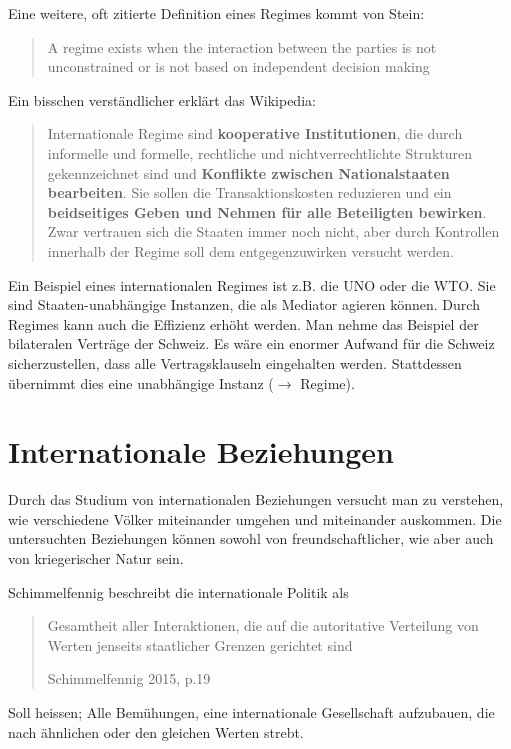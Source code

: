 \documentclass[a4paper, 11pt]{article}
\begin{document}
\noindent Eine weitere, oft zitierte Definition eines Regimes kommt von Stein:
\begin{quote}
    \begin{blockquote}[Stein 1982]{A regime exists when the interaction between the parties is not unconstrained or is not based on independent decision making}
    \end{blockquote}
\end{quote}

\noindent Ein bisschen verständlicher erklärt das Wikipedia: 
\begin{quote}
    \begin{blockquote}[Wikipedia]{Internationale Regime sind \textbf{kooperative Institutionen}, die durch informelle und formelle, rechtliche und nichtverrechtlichte Strukturen gekennzeichnet sind und \textbf{Konflikte zwischen Nationalstaaten bearbeiten}. Sie sollen die Transaktionskosten reduzieren und ein \textbf{beidseitiges Geben und Nehmen für alle Beteiligten bewirken}. Zwar vertrauen sich die Staaten immer noch nicht, aber durch Kontrollen innerhalb der Regime soll dem entgegenzuwirken versucht werden.}
    \end{blockquote}
\end{quote}
Ein Beispiel eines internationalen Regimes ist z.B. die UNO oder die WTO. Sie sind Staaten-unabhängige Instanzen, die als Mediator agieren können. Durch Regimes kann auch die Effizienz erhöht werden. Man nehme das Beispiel der bilateralen Verträge der Schweiz. Es wäre ein enormer Aufwand für die Schweiz sicherzustellen, dass alle Vertragsklauseln eingehalten werden. Stattdessen übernimmt dies eine unabhängige Instanz ($\rightarrow$ Regime).  

\newpage

\section{Internationale Beziehungen}

Durch das Studium von internationalen Beziehungen versucht man zu verstehen, wie verschiedene Völker miteinander umgehen und miteinander auskommen. Die untersuchten Beziehungen können sowohl von freundschaftlicher, wie aber auch von kriegerischer Natur sein.

\vspace{10px}

Schimmelfennig beschreibt die internationale Politik als \blockquote[Schimmelfennig 2015, p.19]{Gesamtheit aller Interaktionen, die auf die autoritative Verteilung von Werten jenseits staatlicher Grenzen gerichtet sind}. Soll heissen; Alle Bemühungen, eine internationale Gesellschaft aufzubauen, die nach ähnlichen oder den gleichen Werten strebt.
\end{document}
